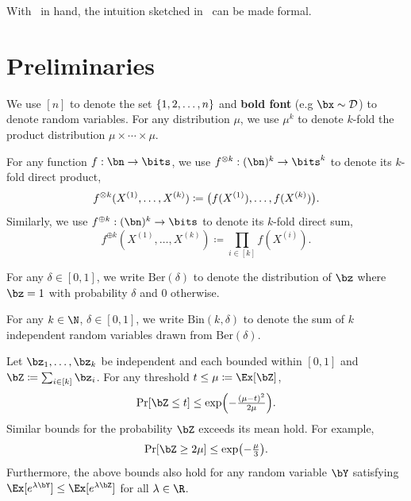 \documentclass[11pt]{article}
\newcommand{\lnote}[1]{\footnote{{\bf \color{blue}Li-Yang}: {#1}}}
\newcommand{\Ber}{\mathrm{Ber}}
\newcommand{\mcD}{\mathcal D}
\newcommand{\Bin}{\mathrm{Bin}}
\DeclarePairedDelimiter\paren{(}{)}
\DeclarePairedDelimiter\set{\{}{\}}
\begin{document}
With~ in hand, the intuition sketched in~ can be made formal. 


\section{Preliminaries}

We use $[n]$ to denote the set $\set{1,2,\ldots, n}$ and \textbf{bold font} (e.g $\bx \sim \mcD$) to denote random variables. For any distribution $\mu$, we use $\mu^k$ to denote $k$-fold the product distribution $\mu \times \cdots \times \mu$.

For any function $f:\bn \to \bits$, we use $f^{\otimes k}: (\bn)^k \to \bits^k$ to denote its $k$-fold direct product,
\begin{equation*}
    f^{\otimes k}(X^{(1)}, \ldots, X^{(k)}) \coloneqq \paren[\big]{f(X^{(1)}), \ldots, f(X^{(k)})}.
\end{equation*}
Similarly, we use $f^{\oplus k}: (\bn)^k \to \bits$ to denote its $k$-fold direct sum,
\begin{equation*}
    f^{\oplus k}(X^{(1)}, \ldots, X^{(k)}) \coloneqq \prod_{i \in [k]}f(X^{(i)}).
\end{equation*}


\begin{definition}
    For any $\delta \in [0,1]$, we write $\Ber(\delta)$ to denote the distribution of $\bz$ where $\bz = 1$ with probability $\delta$ and $0$ otherwise.
\end{definition}

\begin{definition}
    For any $k \in \N$, $\delta \in [0,1]$, we write $\Bin(k, \delta)$ to denote the sum of $k$ independent random variables drawn from $\Ber(\delta)$.
\end{definition}

\begin{fact}
    \label{fact:chernoff}
    Let $\bz_1, \ldots, \bz_k$ be independent and each bounded within $[0,1]$ and $\bZ \coloneqq \sum_{i \in [k]}\bz_i$. For any threshold $t \leq \mu \coloneqq \Ex[\bZ]$,
    \begin{equation*}
        \Pr[\bZ \leq t] \leq \exp\paren*{-\tfrac{(\mu - t)^2}{2\mu}}.
    \end{equation*}
    Similar bounds for the probability $\bZ$ exceeds its mean hold. For example,
    \begin{equation*}
        \Pr[\bZ \geq 2\mu] \leq \exp\paren*{-\tfrac{\mu}{3}}.
    \end{equation*}
    Furthermore, the above bounds also hold for any random variable $\bY$ satisfying $\Ex[e^{\lambda \bY}] \leq \Ex[e^{\lambda \bZ}]$ for all $\lambda \in \R$.
\end{fact}
\end{document}
